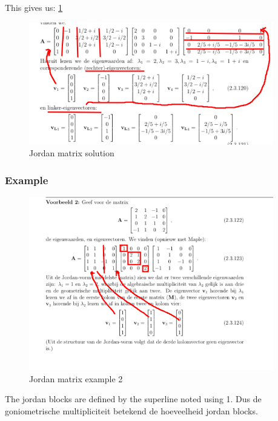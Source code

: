 \documentclass[a4paper]{report}
\begin{document}
This gives us: \ref{fig:jordan_sol}

\begin{figure}[H]
	\begin{center}
		\includegraphics[width=0.95\textwidth]{./images/sol_jordan.png}
	\end{center}
	\caption{Jordan matrix solution}
	\label{fig:jordan_sol}
\end{figure}

\subsubsection{Example}

\begin{figure}[H]
	\begin{center}
		\includegraphics[width=0.95\textwidth]{./images/jordan_ex_2.png}
	\end{center}
	\caption{Jordan matrix example 2}
	\label{fig:jordan_ex_2}
\end{figure}

The jordan blocks are defined by the superline noted using 1.
Dus de goniometrische multipliciteit betekend de hoeveelheid jordan blocks.
\end{document}
